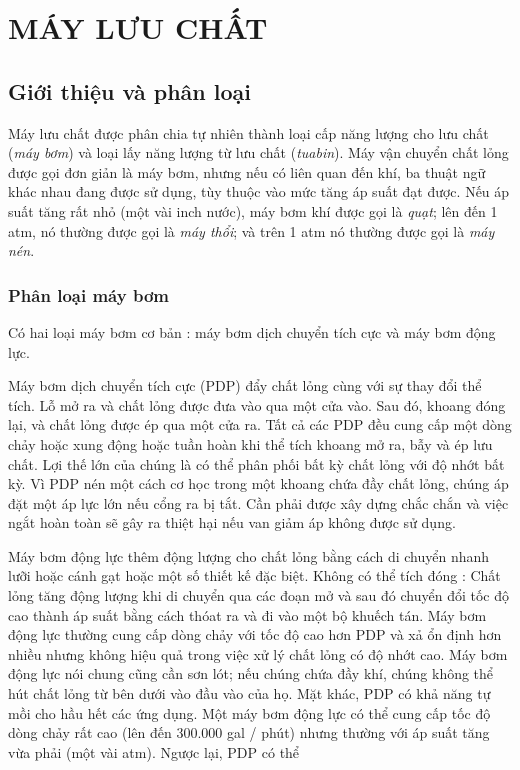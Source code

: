 \documentclass[13.5pt,twoside,a4paper]{extbook}
\begin{document}
\chapter{MÁY LƯU CHẤT}
\section{Giới thiệu và phân loại}
Máy lưu chất được phân chia tự nhiên thành loại cấp năng lượng cho lưu chất (\emph{máy bơm}) và loại lấy năng lượng từ lưu chất (\emph{tuabin}). Máy vận chuyển chất lỏng được gọi đơn giản là máy bơm, nhưng nếu có liên quan đến khí, ba thuật ngữ khác nhau đang được sử dụng, tùy thuộc vào mức tăng áp suất đạt được. Nếu áp suất tăng rất nhỏ (một vài inch nước), máy bơm khí được gọi là \emph{quạt}; lên đến 1 atm, nó thường được gọi là \emph{máy thổi}; và trên 1 atm nó thường được gọi là \emph{máy nén}.
\subsection{Phân loại máy bơm}
Có hai loại máy bơm cơ bản : máy bơm dịch chuyển tích cực và máy bơm động lực.

Máy bơm dịch chuyển tích cực (PDP) đẩy chất lỏng cùng với sự thay đổi thể tích. Lỗ mở ra và chất lỏng được đưa vào qua một cửa vào. Sau đó, khoang đóng lại, và chất lỏng được ép qua một cửa ra. Tất cả các PDP đều cung cấp một dòng chảy hoặc xung động hoặc tuần hoàn khi thể tích khoang mở ra, bẫy và ép lưu chất. Lợi thế lớn của chúng là có thể phân phối bất kỳ chất lỏng với độ nhớt bất kỳ. Vì PDP nén một cách cơ học trong một khoang chứa đầy chất lỏng, chúng áp đặt một áp lực lớn nếu cổng ra bị tắt. Cần phải được xây dựng chắc chắn và việc ngắt hoàn toàn sẽ gây ra thiệt hại nếu van giảm áp không được sử dụng.

Máy bơm động lực thêm động lượng cho chất lỏng bằng cách di chuyển nhanh
lưỡi hoặc cánh gạt hoặc một số thiết kế đặc biệt. Không có thể tích đóng : Chất lỏng tăng động lượng khi di chuyển qua các đoạn mở và sau đó chuyển đổi tốc độ cao thành áp suất bằng cách thóat ra và đi vào một bộ khuếch tán. Máy bơm động lực thường cung cấp dòng chảy với tốc độ cao hơn PDP và xả ổn định hơn nhiều nhưng không hiệu quả trong việc xử lý chất lỏng có độ nhớt cao. Máy bơm động lực nói chung cũng cần sơn lót; nếu chúng chứa đầy khí, chúng không thể hút chất lỏng
từ bên dưới vào đầu vào của họ. Mặt khác, PDP có khả năng tự mồi cho hầu hết các ứng dụng. Một máy bơm động lực có thể cung cấp tốc độ dòng chảy rất cao (lên đến 300.000 gal / phút)
nhưng thường với áp suất tăng vừa phải (một vài atm). Ngược lại, PDP có thể
\end{document}
